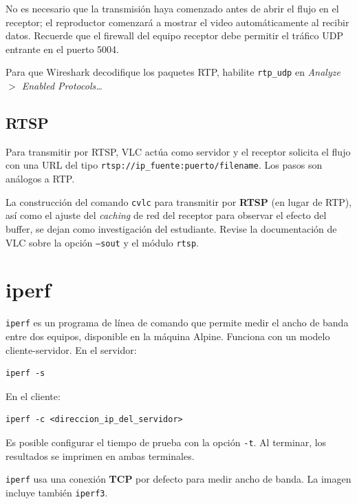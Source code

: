 \documentclass[letterpaper,12pt]{article}
\begin{document}
No es necesario que la transmisión haya comenzado antes de abrir el flujo en el receptor; el reproductor comenzará a mostrar el video automáticamente al recibir datos. Recuerde que el firewall del equipo receptor debe permitir el tráfico UDP entrante en el puerto 5004.

\begin{nota}
Para que Wireshark decodifique los paquetes RTP, habilite \texttt{rtp\_udp} en \textit{Analyze $>$ Enabled Protocols\ldots}
\end{nota}

\subsection{RTSP}

Para transmitir por RTSP, VLC actúa como servidor y el receptor solicita el flujo con una URL del tipo \texttt{rtsp://ip\_fuente:puerto/filename}. Los pasos son análogos a RTP.

\begin{investigar}
La construcción del comando \texttt{cvlc} para transmitir por \textbf{RTSP} (en lugar de RTP), así como el ajuste del \textit{caching} de red del receptor para observar el efecto del buffer, se dejan como investigación del estudiante. Revise la documentación de VLC sobre la opción \texttt{--sout} y el módulo \texttt{rtsp}.
\end{investigar}

\section{iperf}

\texttt{iperf} es un programa de línea de comando que permite medir el ancho de banda entre dos equipos, disponible en la máquina Alpine. Funciona con un modelo cliente-servidor. En el servidor:

\begin{lstlisting}
iperf -s
\end{lstlisting}

En el cliente:

\begin{lstlisting}
iperf -c <direccion_ip_del_servidor>
\end{lstlisting}

Es posible configurar el tiempo de prueba con la opción \texttt{-t}. Al terminar, los resultados se imprimen en ambas terminales.

\begin{nota}
\texttt{iperf} usa una conexión \textbf{TCP} por defecto para medir ancho de banda. La imagen incluye también \texttt{iperf3}.
\end{nota}
\end{document}
